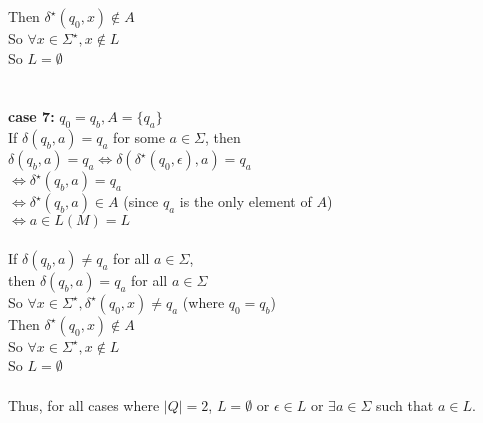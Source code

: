 \documentclass{article}
\begin{document}
Then $\delta^\star(q_0, x) \notin A$\\
So $\forall x \in \Sigma^\star, x \notin L$\\
So $L = \emptyset$\\ \\ \\
\textbf{case 7:} $q_0 = q_b, A = \{q_a\}$\\
If $\delta(q_b, a) = q_a$ for some $a \in \Sigma$, then\\
$\delta(q_b, a) = q_a \Leftrightarrow \delta(\delta^\star(q_0, \epsilon), a) = q_a$\\
$\Leftrightarrow \delta^\star(q_b, a) = q_a$\\
$\Leftrightarrow \delta^\star(q_b, a) \in A$ (since $q_a$ is the only element of $A$)\\
$\Leftrightarrow a \in L(M) = L$\\ \\
If $\delta(q_b, a) \neq q_a$ for all $a \in \Sigma$,\\ 
then $\delta(q_b, a) = q_a$ for all $a \in \Sigma$\\
So $\forall x \in \Sigma^\star, \delta^\star(q_0, x) \neq q_a$ (where $q_0 = q_b$)\\
Then $\delta^\star(q_0, x) \notin A$\\
So $\forall x \in \Sigma^\star, x \notin L$\\
So $L = \emptyset$ \\ \\
Thus, for all cases where $|Q| = 2$, $L = \emptyset$ or $\epsilon \in L$ or $\exists a \in \Sigma$ such that $a \in L$. \\ \\
\end{document}
